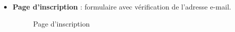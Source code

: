 \documentclass[12pt]{report}
\begin{document}
\begin{itemize}
	\item \textbf{Page d'inscription} : formulaire avec vérification de l’adresse e-mail.
	
	\begin{figure}[H]
		\centering
		\begin{minipage}[t]{0.5\textwidth}
			\centering
			\caption{Page d'inscription}
		\end{minipage}
	\end{figure}
	

\end{itemize}
\end{document}
